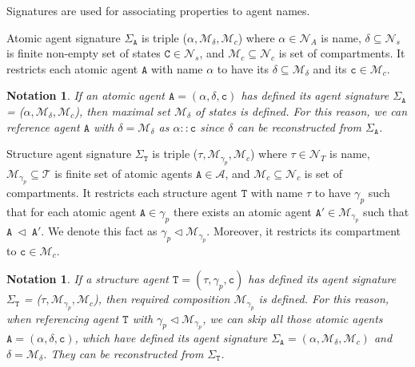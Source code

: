 \documentclass{entcs}
\renewcommand{\~}[0]{\texttildelow}
\newtheorem{notation}[thm]{Notation}
\begin{document}
Signatures are used for associating properties to agent names.

\begin{defn}
Atomic agent signature $\Sigma_\mathtt{A}$ is triple ($\alpha, \mathcal{M}_\delta, \mathcal{M}_c$) where $\alpha \in \mathcal{N}_{A}$ is name, $\delta \subseteq \mathcal{N}_{s}$ is finite non-empty set of states $\mathtt{C} \in \mathcal{N}_{s}$, and $\mathcal{M}_c \subseteq \mathcal{N}_{c}$ is set of compartments. It restricts each atomic agent $\mathtt{A}$ with name $\alpha$ to have its $\delta \subseteq \mathcal{M}_\delta$ and its $\mathtt{c} \in \mathcal{M}_c$. 
\end{defn}

\begin{notation}
If an atomic agent $\mathtt{A} = (\alpha, \delta, \mathtt{c})$ has defined its agent signature $\Sigma_\mathtt{A}$ = ($\alpha, \mathcal{M}_\delta, \mathcal{M}_c$), then maximal set $\mathcal{M}_\delta$ of states is defined. For this reason, we can reference agent $\mathtt{A}$ with $\delta = \mathcal{M}_\delta$ as $\alpha::\mathtt{c}$ since $\delta$ can be reconstructed from $\Sigma_\mathtt{A}$.
\end{notation}

\begin{defn}
Structure agent signature $\Sigma_\mathtt{T}$ is triple ($\tau, \mathcal{M}_{\gamma_p}, \mathcal{M}_c$) where $\tau \in \mathcal{N}_{T}$ is name, $\mathcal{M}_{\gamma_p} \subseteq \mathcal{T}$ is finite set of atomic agents $\mathtt{A} \in \mathcal{A}$, and $\mathcal{M}_c \subseteq \mathcal{N}_{c}$ is set of compartments. It restricts each structure agent $\mathtt{T}$ with name $\tau$ to have $\gamma_p$ such that for each atomic agent $\mathtt{A} \in \gamma_p$ there exists an atomic agent $\mathtt{A}' \in \mathcal{M}_{\gamma_p}$ such that $\mathtt{A}~\lhd~\mathtt{A}'$. We denote this fact as $\gamma_p \lhd \mathcal{M}_{\gamma_p}$. Moreover, it restricts its compartment to $\mathtt{c} \in \mathcal{M}_c$. 
\end{defn}

\begin{notation}
If a structure agent $\mathtt{T} = (\tau, \gamma_p, \mathtt{c})$ has defined its agent signature $\Sigma_\mathtt{T}$ = ($\tau, \mathcal{M}_{\gamma_p}, \mathcal{M}_c$), then required composition $\mathcal{M}_{\gamma_p}$ is defined. For this reason, when referencing agent $\mathtt{T}$ with $\gamma_p \lhd \mathcal{M}_{\gamma_p}$, we can skip all those atomic agents $\mathtt{A} = (\alpha, \delta, \mathtt{c})$, which have defined its agent signature $\Sigma_\mathtt{A} = (\alpha, \mathcal{M}_\delta, \mathcal{M}_c)$ and $\delta = \mathcal{M}_\delta$. They can be reconstructed from $\Sigma_\mathtt{T}$.
\end{notation}
\end{document}
